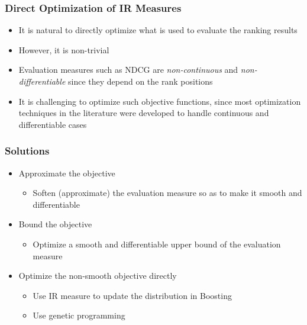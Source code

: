 \documentclass{beamer}
\begin{document}
\begin{frame}
    \frametitle{Direct Optimization of IR Measures}
    \begin{itemize}
    \item It is natural to directly optimize what is used to evaluate the
        ranking results
    \item However, it is non-trivial
    \item Evaluation measures such as NDCG are \emph{non-continuous} and
        \emph{non-differentiable} since they depend on the rank positions
    \item It is challenging to optimize such objective functions, since most
        optimization techniques in the literature were developed to handle
        continuous and differentiable cases
    \end{itemize}
\end{frame}

\begin{frame}
    \frametitle{Solutions}
    \begin{itemize}
    \item Approximate the objective
        \begin{itemize}
        \item Soften (approximate) the evaluation measure so as to make it
            smooth and differentiable
        \end{itemize}
    \item Bound the objective
        \begin{itemize}
        \item Optimize a smooth and differentiable upper bound of the
            evaluation measure
        \end{itemize}
    \item Optimize the non-smooth objective directly
        \begin{itemize}
        \item Use IR measure to update the distribution in Boosting
        \item Use genetic programming
        \end{itemize}
    \end{itemize}
\end{frame}
\end{document}
